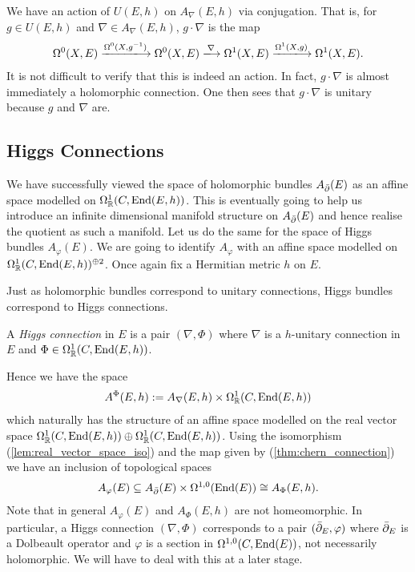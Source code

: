 \documentclass[12pt]{ociamthesis}  %
\begin{document}
We have an action of $U(E,h)$ on $A_\nabla(E,h)$ via conjugation. That is,
for $g\in U(E,h)$ and $\nabla\in A_\nabla(E,h)$, $g\cdot\nabla$ is the map
\begin{align*}
  \Omega^0(X,E) \xlongrightarrow{\Omega^0(X,{g}^{-1})}
  \Omega^0(X,E) \xlongrightarrow{\nabla}
  \Omega^1(X,E) \xlongrightarrow{\Omega^1(X,g)}
  \Omega^1(X,E).
\end{align*}
It is not difficult to verify that this is indeed an action.
In fact, $g\cdot\nabla$ is almost immediately a holomorphic connection.
One then sees that $g\cdot\nabla$ is unitary because
$g$ and $\nabla$ are.


\subsection{Higgs Connections}

We have successfully viewed the space of holomorphic bundles
$A_{\bar{\partial}} (E)$ as an affine space modelled on
$\Omega^1_{\mathbb{R}}(C,\operatorname{End}(E,h))$. This is eventually going
to help us introduce an infinite dimensional manifold structure on
$A_{\bar{\partial}} (E)$ and hence realise the quotient as such a manifold.
Let us do the same for the space of Higgs
bundles $A_\varphi(E)$. We are going to identify $A_\varphi$ with an affine
space modelled on $\Omega^1_{\mathbb{R}}(C,\operatorname{End}(E,h))^{\oplus 2}$.
Once again fix a Hermitian metric $h$ on $E$.

Just as holomorphic bundles correspond to unitary connections, Higgs bundles
correspond to Higgs connections.

\begin{definition}
  A \emph{Higgs connection} in $E$ is a pair $(\nabla,\Phi)$
  where $\nabla$ is a $h$-unitary connection in $E$ and
  $\Phi\in\Omega^1_{\mathbb{R}}(C,\operatorname{End}(E,h))$.
\end{definition}

Hence we have the space
\begin{align}\label{eq:Higgs_connections_space}
  A^{\Phi}(E,h) := A_\nabla(E,h) \times \Omega^1_{\mathbb{R}}(C,\operatorname{End}(E,h))
\end{align}
which naturally has the structure of an affine space modelled on
the real vector space
$\Omega^1_{\mathbb{R}}(C,\operatorname{End}(E,h))\oplus\Omega_{\mathbb{R}}^1(C,\operatorname{End}(E,h))$. Using the isomorphism (\ref{lem:real_vector_space_iso})
and the map given by (\ref{thm:chern_connection}) we have an inclusion
of topological spaces
\begin{align*}
  A_\varphi(E) \subseteq A_{\bar{\partial}} (E) \times \Omega^{1,0}(\operatorname{End}(E)) \cong A_\Phi (E,h).
\end{align*}
Note that in general $A_\varphi(E)$ and $A_\Phi (E,h)$ are not homeomorphic. In
particular, a Higgs connection $(\nabla,\Phi)$ corresponds to
a pair $({\bar{\partial}}_E,\varphi)$ where ${\bar{\partial}}_E$ is a Dolbeault operator and
$\varphi$ is a section in $\Omega^{1,0}(C,\operatorname{End}(E))$, not necessarily
holomorphic. We will have to deal with this at a later stage.
\end{document}
